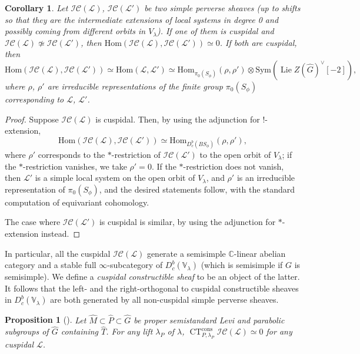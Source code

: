 \documentclass{amsart}
\newtheorem{proposition}[theorem]{Proposition}
\newtheorem{corollary}[theorem]{Corollary}
\theoremstyle{definition}
\theoremstyle{remark}
\numberwithin{equation}{section}
\DeclareMathOperator{\Lie}{Lie}
\newcommand{\mc}{\mathcal}
\newcommand{\C}{\mathbb{C}}
\newcommand{\wh}{\widehat}
\newcommand{\Sym}{\mathrm{Sym}}
\DeclareMathOperator{\CT}{\mathrm{CT}}
\newcommand{\V}{\mathbb{V}}
\begin{document}
\begin{corollary}\label{cor: Hom_between_cuspidal_perverse_sheaves}
Let $\mc{IC}(\mc L)$, $\mc{IC}(\mc L')$ be two simple perverse sheaves (up to shifts so that they are the intermediate extensions of local systems in degree 0 and possibly coming from different orbits in $V_{\lambda}$). If one of them is cuspidal and $\mc{IC}(\mc L)\not\simeq \mc{IC}(\mc L')$, then $\mathrm{Hom}(\mc{IC}(\mc L), \mc{IC}(\mc L'))\simeq 0$. If both are cuspidal, then
\[
\mathrm{Hom}(\mc{IC}(\mc L), \mc{IC}(\mc L'))\simeq \mathrm{Hom}(\mc L, \mc L') \simeq \mathrm{Hom}_{\pi_0(S_{\phi})}(\rho, \rho')\otimes \Sym(\Lie Z(\wh G)^\vee[-2]), 
\]
where $\rho$, $\rho'$ are irreducible representations of the finite group $\pi_0(S_{\phi})$ corresponding to $\mc L$, $\mc L'$.
\end{corollary}

\begin{proof}
Suppose $\mc{IC}(\mc L)$ is cuspidal. Then, by using the adjunction for $!$-extension, 
\[
\mathrm{Hom}(\mc{IC}(\mc L), \mc{IC}(\mc L'))\simeq \mathrm{Hom}_{D_c^b(BS_\phi)}(\rho, \rho'),
\]
where $\rho'$ corresponds to the $*$-restriction of $\mc{IC}(\mc L')$ to the open orbit of $V_{\lambda}$; if the $*$-restriction vanishes, we take $\rho'=0$. If the $*$-restriction does not vanish, then $\mc L'$ is a simple local system on the open orbit of $V_{\lambda}$, and $\rho'$ is an irreducible representation of $\pi_0(S_{\phi})$, and the desired statements follow, with the standard computation of equivariant cohomology. 

The case where $\mc{IC}(\mc L')$ is cuspidal is similar, by using the adjunction for $*$-extension instead.
\end{proof}

In particular, all the cuspidal $\mc{IC} (\mc L)$ generate a semisimple $\C$-linear abelian category and a stable full $\infty$-subcategory of $D_c^b(\V_\lambda)$ (which is semisimple if $G$ is semisimple). We define a \emph{cuspidal constructible sheaf} to be an object of the latter. It follows that the left- and the right-orthogonal to cuspidal constructible sheaves in $D_c^b (\V_\lambda)$ are both generated by all non-cuspidal simple perverse sheaves. 

\begin{proposition}[{\cite[\S 4.4(c)]{LusztigGraded}}]\label{prop: CT_cuspidal_constructible_sheaves=0}
Let $\wh M\subset \wh P\subset \wh G$ be proper semistandard Levi and parabolic subgroups of $\wh{G}$ containing $\wh T$. For any lift $\lambda_P$ of $\lambda$, 
$\CT_{P, \lambda_P}^{\mathrm{cons}}\mc{IC} (\mc L)\simeq 0$ for any cuspidal $\mc L$. 
\end{proposition}
\end{document}
